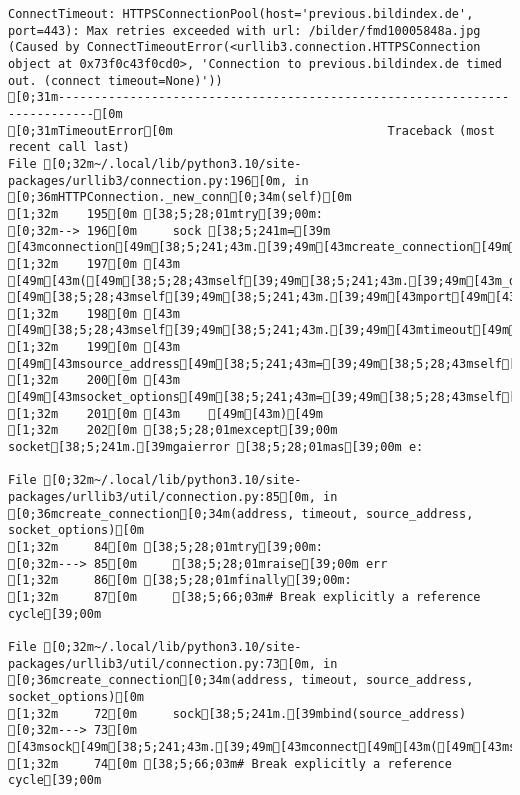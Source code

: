 \documentclass[
  a4paper,
  portrait]{book}
\begin{document}
\begin{verbatim}
ConnectTimeout: HTTPSConnectionPool(host='previous.bildindex.de', port=443): Max retries exceeded with url: /bilder/fmd10005848a.jpg (Caused by ConnectTimeoutError(<urllib3.connection.HTTPSConnection object at 0x73f0c43f0cd0>, 'Connection to previous.bildindex.de timed out. (connect timeout=None)'))
[0;31m---------------------------------------------------------------------------[0m
[0;31mTimeoutError[0m                              Traceback (most recent call last)
File [0;32m~/.local/lib/python3.10/site-packages/urllib3/connection.py:196[0m, in [0;36mHTTPConnection._new_conn[0;34m(self)[0m
[1;32m    195[0m [38;5;28;01mtry[39;00m:
[0;32m--> 196[0m     sock [38;5;241m=[39m [43mconnection[49m[38;5;241;43m.[39;49m[43mcreate_connection[49m[43m([49m
[1;32m    197[0m [43m        [49m[43m([49m[38;5;28;43mself[39;49m[38;5;241;43m.[39;49m[43m_dns_host[49m[43m,[49m[43m [49m[38;5;28;43mself[39;49m[38;5;241;43m.[39;49m[43mport[49m[43m)[49m[43m,[49m
[1;32m    198[0m [43m        [49m[38;5;28;43mself[39;49m[38;5;241;43m.[39;49m[43mtimeout[49m[43m,[49m
[1;32m    199[0m [43m        [49m[43msource_address[49m[38;5;241;43m=[39;49m[38;5;28;43mself[39;49m[38;5;241;43m.[39;49m[43msource_address[49m[43m,[49m
[1;32m    200[0m [43m        [49m[43msocket_options[49m[38;5;241;43m=[39;49m[38;5;28;43mself[39;49m[38;5;241;43m.[39;49m[43msocket_options[49m[43m,[49m
[1;32m    201[0m [43m    [49m[43m)[49m
[1;32m    202[0m [38;5;28;01mexcept[39;00m socket[38;5;241m.[39mgaierror [38;5;28;01mas[39;00m e:

File [0;32m~/.local/lib/python3.10/site-packages/urllib3/util/connection.py:85[0m, in [0;36mcreate_connection[0;34m(address, timeout, source_address, socket_options)[0m
[1;32m     84[0m [38;5;28;01mtry[39;00m:
[0;32m---> 85[0m     [38;5;28;01mraise[39;00m err
[1;32m     86[0m [38;5;28;01mfinally[39;00m:
[1;32m     87[0m     [38;5;66;03m# Break explicitly a reference cycle[39;00m

File [0;32m~/.local/lib/python3.10/site-packages/urllib3/util/connection.py:73[0m, in [0;36mcreate_connection[0;34m(address, timeout, source_address, socket_options)[0m
[1;32m     72[0m     sock[38;5;241m.[39mbind(source_address)
[0;32m---> 73[0m [43msock[49m[38;5;241;43m.[39;49m[43mconnect[49m[43m([49m[43msa[49m[43m)[49m
[1;32m     74[0m [38;5;66;03m# Break explicitly a reference cycle[39;00m


\end{verbatim}
\end{document}
